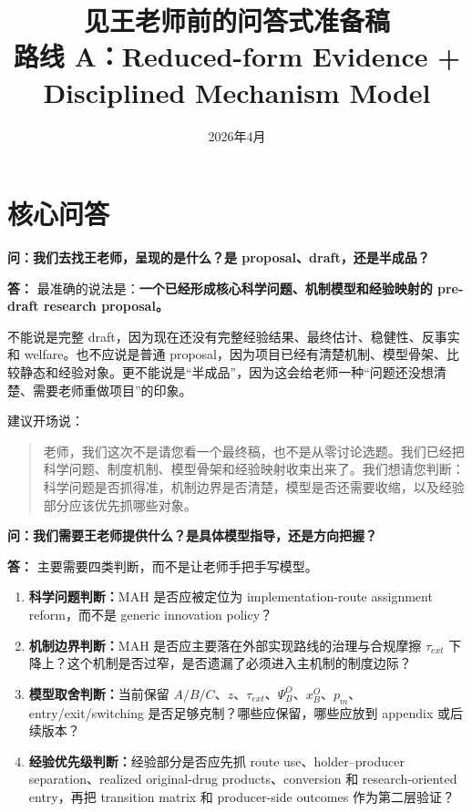 \documentclass[10pt]{ctexart}
\title{见王老师前的问答式准备稿\\\large 路线 A：Reduced-form Evidence + Disciplined Mechanism Model}
\author{}
\date{2026年4月}
\newcommand{\qtitle}[1]{\vspace{0.35em}\noindent\textbf{问：#1}\par\vspace{0.15em}\noindent\textbf{答：}}
\newcommand{\key}[1]{\textbf{#1}}
\begin{document}
\flushbottom
\small
\maketitle

\begin{center}
\end{center}

\vspace{-0.35em}

\section{核心问答}

\qtitle{我们去找王老师，呈现的是什么？是 proposal、draft，还是半成品？}
最准确的说法是：\key{一个已经形成核心科学问题、机制模型和经验映射的 pre-draft research proposal。}

不能说是完整 draft，因为现在还没有完整经验结果、最终估计、稳健性、反事实和 welfare。也不应说是普通 proposal，因为项目已经有清楚机制、模型骨架、比较静态和经验对象。更不能说是“半成品”，因为这会给老师一种“问题还没想清楚、需要老师重做项目”的印象。

建议开场说：
\begin{quote}
老师，我们这次不是请您看一个最终稿，也不是从零讨论选题。我们已经把科学问题、制度机制、模型骨架和经验映射收束出来了。我们想请您判断：科学问题是否抓得准，机制边界是否清楚，模型是否还需要收缩，以及经验部分应该优先抓哪些对象。
\end{quote}

\qtitle{我们需要王老师提供什么？是具体模型指导，还是方向把握？}
主要需要四类判断，而不是让老师手把手写模型。

\begin{enumerate}
    \item \key{科学问题判断：}MAH 是否应被定位为 implementation-route assignment reform，而不是 generic innovation policy？
    \item \key{机制边界判断：}MAH 是否应主要落在外部实现路线的治理与合规摩擦 \(\tau_{ext}\) 下降上？这个机制是否过窄，是否遗漏了必须进入主机制的制度边际？
    \item \key{模型取舍判断：}当前保留 \(A/B/C\)、\(z\)、\(\tau_{ext}\)、\(\Psi_B^O\)、\(x_B^O\)、\(p_m\)、entry/exit/switching 是否足够克制？哪些应保留，哪些应放到 appendix 或后续版本？
    \item \key{经验优先级判断：}经验部分是否应先抓 route use、holder--producer separation、realized original-drug products、conversion 和 research-oriented entry，再把 transition matrix 和 producer-side outcomes 作为第二层验证？
\end{enumerate}
\end{document}
